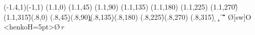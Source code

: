 \begin{zahyou*}[ul=3.5zw](-1.4,1)(-1,1)%
\kyokuTyoku(1.1,0)\A%
\kyokuTyoku(1.1,45)\B%
\kyokuTyoku(1.1,90)\C%
\kyokuTyoku(1.1,135)\D%
\kyokuTyoku(1.1,180)\E%
\kyokuTyoku(1.1,225)\F%
\kyokuTyoku(1.1,270)\G%
\kyokuTyoku(1.1,315)\H%
\kyokuTyoku(.8,0)\a%
\kyokuTyoku(.8,45)\b%
\kyokuTyoku(.8,90)\c%
\kyokuTyoku(.8,135)\d%
\kyokuTyoku(.8,180)\e%
\kyokuTyoku(.8,225)\f%
\kyokuTyoku(.8,270)\g%
\kyokuTyoku(.8,315)\h
\ArrowLine\a\A
\ArrowLine\b\B
\ArrowLine\c\C
\ArrowLine\d\D
\ArrowLine\e\E
\ArrowLine\f\F
\ArrowLine\g\G
\ArrowLine\h\H
{}
\Put\O[sw]{O}
\kuromaru{\O}
\HenKo<henkoH=5pt>\a\O{$\,r\,$}
\Put{}
\end{zahyou*}
